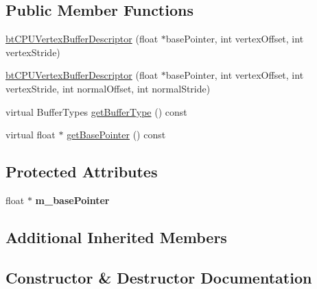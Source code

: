 \subsection*{Public Member Functions}
\begin{DoxyCompactItemize}
\item 
\hyperlink{classbtCPUVertexBufferDescriptor_a297805188e446adfe37fbe68a9474d66}{bt\+C\+P\+U\+Vertex\+Buffer\+Descriptor} (float $\ast$base\+Pointer, int vertex\+Offset, int vertex\+Stride)
\item 
\hyperlink{classbtCPUVertexBufferDescriptor_ac535162f5921eec33b7f179574d512d1}{bt\+C\+P\+U\+Vertex\+Buffer\+Descriptor} (float $\ast$base\+Pointer, int vertex\+Offset, int vertex\+Stride, int normal\+Offset, int normal\+Stride)
\item 
virtual Buffer\+Types \hyperlink{classbtCPUVertexBufferDescriptor_ab0ade8a42a69f574e48abb88b7e5350e}{get\+Buffer\+Type} () const
\item 
virtual float $\ast$ \hyperlink{classbtCPUVertexBufferDescriptor_a491e17ba85f6efc4433595b75c0ba928}{get\+Base\+Pointer} () const
\end{DoxyCompactItemize}
\subsection*{Protected Attributes}
\begin{DoxyCompactItemize}
\item 
\mbox{\label{classbtCPUVertexBufferDescriptor_a6869b86f51729f404f498c747b3305f5}} 
float $\ast$ {\bfseries m\+\_\+base\+Pointer}
\end{DoxyCompactItemize}
\subsection*{Additional Inherited Members}


\subsection{Constructor \& Destructor Documentation}
\mbox{\label{classbtCPUVertexBufferDescriptor_a297805188e446adfe37fbe68a9474d66}} 
